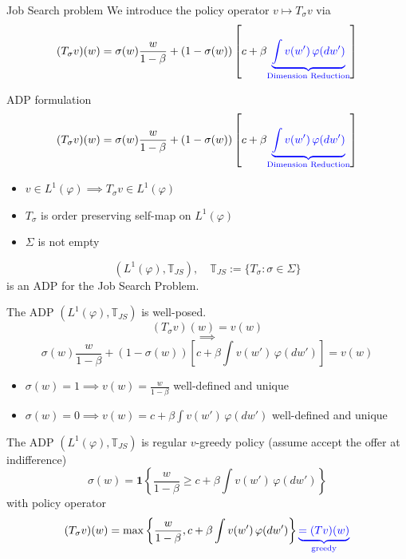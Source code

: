 \documentclass[aspectratio=169]{beamer} %
\begin{document}
\begin{frame}{Job Search problem}
We introduce the policy operator $v\mapsto T_\sigma v$ via
$$
(T_\sigma v)(w) = \sigma(w) \frac{w}{1-\beta} + (1-\sigma(w))\left[c+\beta\textcolor{blue}{\underbrace{\int v(w')\, \varphi(dw')}_{\text{Dimension Reduction}}}\right]
$$
    
\end{frame}

\begin{frame}{ADP formulation}
$$
(T_\sigma v)(w) = \sigma(w) \frac{w}{1-\beta} + (1-\sigma(w))\left[c+\beta\textcolor{blue}{\underbrace{\int v(w')\, \varphi(dw')}_{\text{Dimension Reduction}}}\right]
$$

\begin{itemize}
    \item $v\in L^1(\varphi)\implies T_\sigma v\in L^1(\varphi)$
    \item $T_\sigma$ is order preserving self-map on $L^1(\varphi)$
    \item $\Sigma$ is not empty
\end{itemize}
$$
(L^1(\varphi),\mathbb{T}_{JS}), \quad \mathbb{T}_{JS}:=\{T_\sigma: \sigma\in\Sigma\}
$$
is an ADP for the Job Search Problem. 
\end{frame}

\begin{frame}{The ADP $(L^1(\varphi),\mathbb{T}_{JS})$ is well-posed.}
 $$
 (T_\sigma v)(w) = v(w) 
 $$
 $$
\implies
 $$
    $$
\sigma(w) \frac{w}{1-\beta} + (1-\sigma(w))\left[c+\beta\int v(w')\, \varphi(dw')\right] = v(w)
$$

\begin{itemize}
    \item $\sigma(w) = 1 \implies v(w) = \frac{w}{1-\beta} $ well-defined and unique
    \item $\sigma(w) = 0\implies v(w) = c+\beta\int v(w') \, \varphi(dw')$ well-defined and unique
\end{itemize}

\end{frame}

\begin{frame}{The ADP $(L^1(\varphi),\mathbb{T}_{JS})$ is regular}
$v$-greedy policy (assume accept the offer at indifference)
    $$
    \sigma (w) = \mathbf{1}\left\{\frac{w}{1-\beta}\ge c+\beta\int v(w') \, \varphi(dw') \right\}
    $$
    with policy operator
    $$
    (T_\sigma v)(w) = \max\left\{\frac{w}{1-\beta}, c+\beta\int v(w') \, \varphi(dw')\right\} \textcolor{blue}{\underbrace{= (Tv)(w)}_{\text{greedy}}}
    $$
\end{frame}
\end{document}
